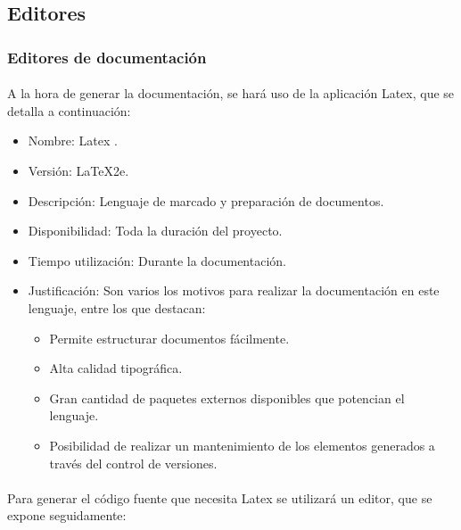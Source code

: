    \subsection{Editores}

      \subsubsection{Editores de documentación}

      \paragraph{}A la hora de generar la documentación, se hará uso de la
      aplicación Latex, que se detalla a continuación:

      \begin{itemize}
         \item Nombre: Latex \cite{latex}.
         \item Versión: LaTeX2e.
         \item Descripción: Lenguaje de marcado y preparación de documentos.
         \item Disponibilidad: Toda la duración del proyecto.
         \item Tiempo utilización: Durante la documentación.
         \item Justificación: Son varios los motivos para realizar la
         documentación en este lenguaje, entre los que destacan:
            \begin{itemize}
               \item Permite estructurar documentos fácilmente.
               \item Alta calidad tipográfica.
               \item Gran cantidad de paquetes externos disponibles que
               potencian el lenguaje.
               \item Posibilidad de realizar un mantenimiento de los elementos
               generados a través del control de versiones.
            \end{itemize}
      \end{itemize}

      \paragraph{}Para generar el código fuente que necesita Latex se utilizará
      un editor, que se expone seguidamente:

